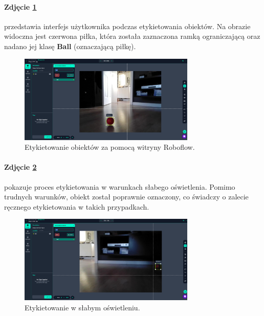 \documentclass[a4paper,twoside,12pt]{book}
\begin{document}
\newpage

\paragraph{Zdjęcie \ref{fig:labeling1}}
przedstawia interfejs użytkownika podczas etykietowania obiektów. Na obrazie widoczna jest czerwona piłka, która została zaznaczona ramką ograniczającą oraz nadano jej klasę \textbf{Ball} (oznaczającą piłkę).

\begin{figure}[h]
	\centering
	\includegraphics[width=0.75\textwidth]{Images/Roboflow/labeling1.png}
	\caption{Etykietowanie obiektów za pomocą witryny Roboflow.}
	\label{fig:labeling1}
\end{figure}

\paragraph{Zdjęcie \ref{fig:labeling3}}
pokazuje proces etykietowania w warunkach słabego oświetlenia. Pomimo trudnych warunków, obiekt został poprawnie oznaczony, co świadczy o zalecie ręcznego etykietowania w takich przypadkach.

\begin{figure}[h]
    \centering
    \includegraphics[width=0.75\textwidth]{Images/Roboflow/labeling3.png}
    \caption{Etykietowanie w słabym oświetleniu.}
    \label{fig:labeling3}
\end{figure}

\newpage
\end{document}
